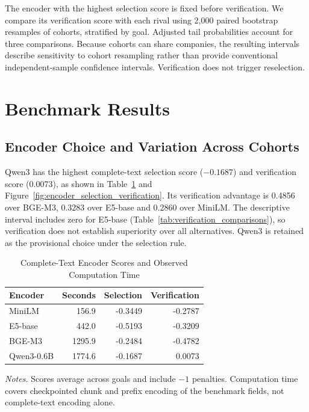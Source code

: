 \documentclass[12pt]{article}
\begin{document}
The encoder with the highest selection score is fixed before verification. We compare its verification score with each rival using 2,000 paired bootstrap resamples of cohorts, stratified by goal. Adjusted tail probabilities account for three comparisons. Because cohorts can share companies, the resulting intervals describe sensitivity to cohort resampling rather than provide conventional independent-sample confidence intervals. Verification does not trigger reselection.

\section{Benchmark Results}
\subsection{Encoder Choice and Variation Across Cohorts}
Qwen3 has the highest complete-text selection score ($-0.1687$) and verification score (0.0073), as shown in Table~\ref{tab:encoder_scores} and Figure~\ref{fig:encoder_selection_verification}. Its verification advantage is 0.4856 over BGE-M3, 0.3283 over E5-base and 0.2860 over MiniLM. The descriptive interval includes zero for E5-base (Table~\ref{tab:verification_comparisons}), so verification does not establish superiority over all alternatives. Qwen3 is retained as the provisional choice under the selection rule.

\begin{table}[htbp]
\centering
\caption{Complete-Text Encoder Scores and Observed Computation Time}
\label{tab:encoder_scores}
\begin{tabular}{@{}lrrr@{}}
\toprule
Encoder & Seconds & Selection & Verification \\
\midrule
MiniLM & 156.9 & -0.3449 & -0.2787 \\
E5-base & 442.0 & -0.5193 & -0.3209 \\
BGE-M3 & 1295.9 & -0.2484 & -0.4782 \\
Qwen3-0.6B & 1774.6 & -0.1687 & 0.0073 \\
\bottomrule
\end{tabular}
\par\smallskip
\begin{minipage}{\linewidth}\footnotesize
\textit{Notes.} Scores average across goals and include $-1$ penalties. Computation time covers checkpointed chunk and prefix encoding of the benchmark fields, not complete-text encoding alone.
\end{minipage}
\end{table}
\end{document}
